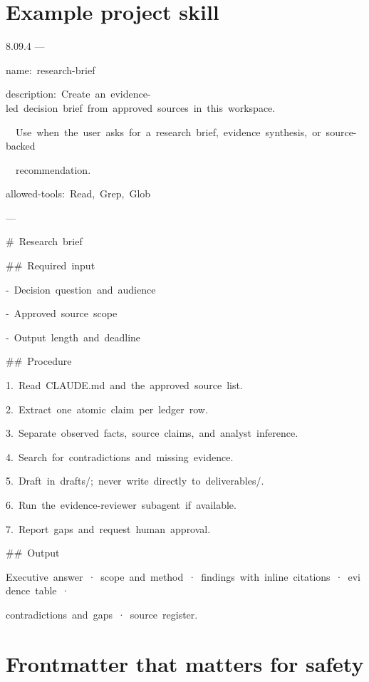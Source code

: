 \documentclass[11pt,a4paper,twoside,openany]{book}
\newcommand{\cl}[1]{\noindent\mbox{#1}\par}
\begin{document}
\FloatBarrier
\setcounter{section}{1}
\section{Example project skill}

\begin{codeblock}{8.0}{9.4}
\cl{---}
\cl{name:~research-brief}
\cl{description:~Create~an~evidence-led~decision~brief~from~approved~sources~in~this~workspace.}
\cl{~~Use~when~the~user~asks~for~a~research~brief,~evidence~synthesis,~or~source-backed}
\cl{~~recommendation.}
\cl{allowed-tools:~Read,~Grep,~Glob}
\cl{---}
\cl{}
\cl{\#~Research~brief}
\cl{}
\cl{\#\#~Required~input}
\cl{-~Decision~question~and~audience}
\cl{-~Approved~source~scope}
\cl{-~Output~length~and~deadline}
\cl{}
\cl{\#\#~Procedure}
\cl{1.~Read~\textasciigrave{}CLAUDE.md\textasciigrave{}~and~the~approved~source~list.}
\cl{2.~Extract~one~atomic~claim~per~ledger~row.}
\cl{3.~Separate~observed~facts,~source~claims,~and~analyst~inference.}
\cl{4.~Search~for~contradictions~and~missing~evidence.}
\cl{5.~Draft~in~\textasciigrave{}drafts/\textasciigrave{};~never~write~directly~to~\textasciigrave{}deliverables/\textasciigrave{}.}
\cl{6.~Run~the~evidence-reviewer~subagent~if~available.}
\cl{7.~Report~gaps~and~request~human~approval.}
\cl{}
\cl{\#\#~Output}
\cl{Executive~answer~·~scope~and~method~·~findings~with~inline~citations~·~evidence~table~·}
\cl{contradictions~and~gaps~·~source~register.}
\end{codeblock}

\FloatBarrier
\setcounter{section}{2}
\section{Frontmatter that matters for safety}
\end{document}
